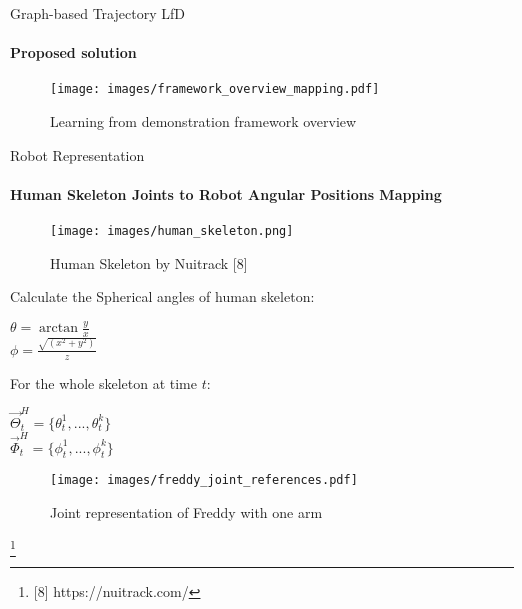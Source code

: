 \documentclass[aspectratio=169]{beamer}
\newcommand\blfootnote[1]{%
	\begingroup
	\renewcommand\thefootnote{}\footnote{#1}%
	\addtocounter{footnote}{-1}%
	\endgroup
}
\begin{document}
\begin{frame}{Graph-based Trajectory LfD}
	\framesubtitle{Proposed solution}
	\begin{figure}[tp]
		\centering
		\texttt{[image: images/framework\_overview\_mapping.pdf]}
		\vspace{-0.4cm}
		\caption{Learning from demonstration framework overview}
		\label{fig:framework_overview}
	\end{figure}
\end{frame}

\begin{frame}{Robot Representation}
	\framesubtitle{Human Skeleton Joints to Robot Angular Positions Mapping}
	\begin{minipage}{0.33\linewidth}
		\vspace{-0.8em}	
		\begin{figure}[h!]
			\texttt{[image: images/human\_skeleton.png]}
			\caption{Human Skeleton by Nuitrack [8]}
		\end{figure}
	\end{minipage}
	\hfill
	\begin{minipage}{0.33\linewidth}
		\vspace{-2em}
		Calculate the Spherical angles of human skeleton: 
		
		\centering
		$\theta = \arctan \frac{y}{x}$ \\
		\centering
		$\phi = \frac{\sqrt{(x^2 + y^2)}}{z}$ \\ \hfill

		For the whole skeleton at time $t$: 
		\hfill
		\hfill
		
		\centering
		$\vec \Theta^H_t = \{\theta^1_t,...,\theta^k_t\}$ \\
		\centering
		$\vec \Phi^H_t = \{\phi^1_t,...,\phi^k_t\}$ \\
	\end{minipage}
	\hfill
	\begin{minipage}{0.3\linewidth}	
		\begin{figure}[h!]
			\texttt{[image: images/freddy\_joint\_references.pdf]}
			\vspace{-0.5em}
			\caption{Joint representation of Freddy with one arm}
		\end{figure}
	\end{minipage}
	\vspace{-0.8em}
	 \blfootnote{[8] https://nuitrack.com/}
\end{frame}
\end{document}
